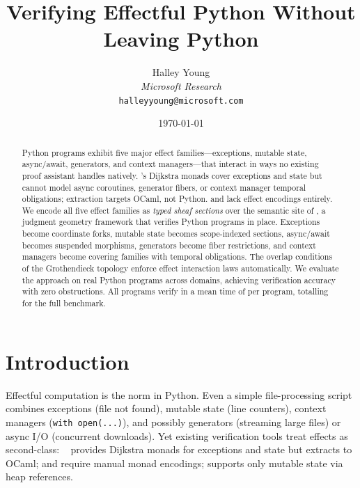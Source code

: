 \documentclass[11pt]{article}
\title{\textbf{Verifying Effectful Python Without Leaving Python}}
\author{%
  Halley Young\\
  \textit{Microsoft Research}\\
  \texttt{halleyyoung@microsoft.com}
}
\date{\today}
\begin{document}
\maketitle

\begin{abstract}
Python programs exhibit five major effect families---exceptions,
mutable state, async/await, generators, and context managers---that
interact in ways no existing proof assistant handles natively.
\Fstar{}'s Dijkstra monads cover exceptions and state but cannot
model async coroutines, generator fibers, or context manager temporal
obligations; extraction targets OCaml, not Python.  \LEAN{} and
\Coq{} lack effect encodings entirely.  We encode all five effect
families as \emph{typed sheaf sections} over the semantic site of
\JuGeo{}, a judgment geometry framework that verifies Python programs
in place.  Exceptions become coordinate forks, mutable state becomes
scope-indexed sections, async/await becomes suspended morphisms,
generators become fiber restrictions, and context managers become
covering families with temporal obligations.  The overlap conditions
of the Grothendieck topology enforce effect interaction laws
automatically.  We evaluate the approach on \expTotalPrograms{}
real Python programs across \expDomainCount{} domains, achieving
\expAccuracy{} verification accuracy with zero obstructions.
All \expVerified{} programs verify in a mean time of \expTimeMean{}
per program, totalling \expTimeTotal{} for the full benchmark.
\end{abstract}

\newpage

\section{Introduction}\label{sec:intro}

Effectful computation is the norm in Python.  Even a simple file-processing
script combines exceptions (file not found), mutable state (line counters),
context managers (\texttt{with open(...)}), and possibly generators
(streaming large files) or async I/O (concurrent downloads).  Yet existing
verification tools treat effects as second-class: \Fstar{}~\cite{fstar-effects}
provides Dijkstra monads for exceptions and state but extracts to OCaml;
\LEAN{} and \Coq{} require manual monad encodings; \Dafny{} supports only
mutable state via heap references.
\end{document}

